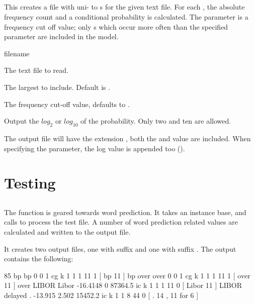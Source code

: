 \documentclass[a4paper,10pt,twoside]{report}
\begin{document}
\subsection{}

This creates a file with uni- to \ngram{}s for the given text
file. For each \ngram{}, the absolute frequency count and a
conditional probability is calculated. The  parameter is a
frequency cut off value; only \ngram{}s which occur more often than
the specified  parameter are included in the model.

\begin{varlist}{filename}
\item[filename] The text file to read.
\item[n] The largest \ngram{} to include. Default is .
\item[fco] The frequency cut-off value, defaults to .
\item[log] Output the $log_2$ or $log_{10}$ of the probability. Only
  two and ten are allowed.
\end{varlist}

The output file will have the extension , both the
 and  value are included. When specifying the
 parameter, the log value is appended too ().

\section{Testing}

\subsection{}

The  function is geared towards word prediction. It takes
an instance base, and calls \Timbl{} to process the test file. A
number of word prediction related values are calculated and written to
the output file.

It creates two output files, one with suffix  and one with
suffix .  The  output contains the following:

\begin{wout}{}
85 bp bp 0 0 1 cg k 1 1 1 11 1 [ bp 11 ]
bp over over 0 0 1 cg k 1 1 1 11 1 [ over 11 ]
over LIBOR Libor -16.4148 0 87364.5 ic k 1 1 1 11 0 [ Libor 11 ]
LIBOR delayed . -13.915 2.502 15452.2 ic k 1 1 8 44 0 [ . 14 , 11 for 6 ]
\end{wout}
\end{document}
